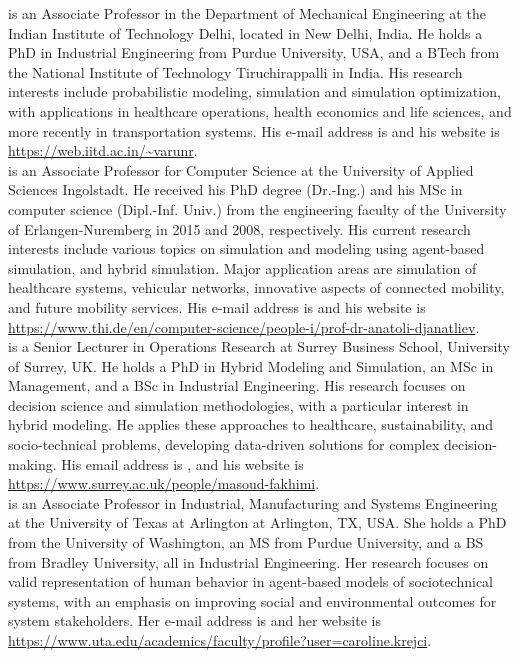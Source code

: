 \documentclass{wscpaperproc}
\theoremstyle{wsc}
\begin{document}
 is an Associate Professor in the Department of Mechanical Engineering at the Indian Institute of Technology Delhi, located in New Delhi, India. He holds a PhD in Industrial Engineering from Purdue University, USA, and a BTech from the National Institute of Technology Tiruchirappalli in India. His research interests include probabilistic modeling, simulation and simulation optimization, with applications in healthcare operations, health economics and life sciences, and more recently in transportation systems. His e-mail address is  and his website is \url{https://web.iitd.ac.in/~varunr}.\\

 is an Associate Professor for Computer Science at the University of Applied Sciences Ingolstadt. He received his PhD degree (Dr.-Ing.) and his MSc in computer science (Dipl.-Inf. Univ.) from the engineering faculty of the University of Erlangen-Nuremberg in 2015 and 2008, respectively. His current research interests include various topics on simulation and modeling using agent-based simulation, and hybrid simulation. Major application areas are simulation of healthcare systems, vehicular networks, innovative aspects of connected mobility, and future mobility services. His e-mail address is  and his website is \url{https://www.thi.de/en/computer-science/people-i/prof-dr-anatoli-djanatliev}.\\

 is a Senior Lecturer in Operations Research at Surrey Business School, University of Surrey, UK. He holds a PhD in Hybrid Modeling and Simulation, an MSc in Management, and a BSc in Industrial Engineering. His research focuses on decision science and simulation methodologies, with a particular interest in hybrid modeling. He applies these approaches to healthcare, sustainability, and socio-technical problems, developing data-driven solutions for complex decision-making. His email address is , and his website is \url{https://www.surrey.ac.uk/people/masoud-fakhimi}.\\

 is an Associate Professor in Industrial, Manufacturing and Systems Engineering at the University of Texas at Arlington at Arlington, TX, USA. She holds a PhD from the University of Washington, an MS from Purdue University, and a BS from Bradley University, all in Industrial Engineering. Her research focuses on valid representation of human behavior in agent-based models of sociotechnical systems, with an emphasis on improving social and environmental outcomes for system stakeholders. Her e-mail address is  and her website is \url{https://www.uta.edu/academics/faculty/profile?user=caroline.krejci}.\\
\end{document}
